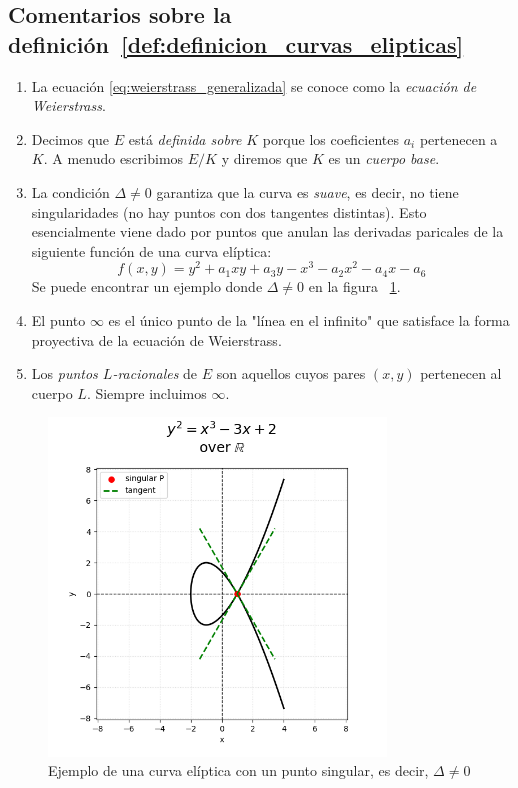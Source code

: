 \subsection{Comentarios sobre la definición~\ref{def:definicion_curvas_elipticas}}
\begin{enumerate}
  \item La ecuación \eqref{eq:weierstrass_generalizada} se conoce como la \emph{ecuación de Weierstrass}.
  \item Decimos que \(E\) está \emph{definida sobre} \(K\) porque los coeficientes \(a_i\) pertenecen a \(K\). A menudo escribimos \(E/K\) y diremos que \(K\) es un \emph{cuerpo base}.
  \item La condición \(\Delta\neq0\) garantiza que la curva es \emph{suave}, es decir, no tiene singularidades (no hay puntos con dos tangentes distintas). Esto esencialmente viene dado por puntos que anulan las derivadas paricales de la siguiente función de una curva elíptica:
  \[
    f(x,y) = y^2 +a_1xy + a_3y -x^3 - a_2x^2 - a_4x - a_6
  \]
  Se puede encontrar un ejemplo donde \(\Delta\neq0\) en la figura ~\ref{fig:elliptic_curve_singular_example}.
  \item El punto \(\infty\) es el único punto de la "línea en el infinito" que satisface la forma proyectiva de la ecuación de Weierstrass.
  \item Los \emph{puntos \(L\)-racionales} de \(E\) son aquellos cuyos pares \((x,y)\) pertenecen al cuerpo \(L\). Siempre incluimos \(\infty\).
\end{enumerate}

\begin{figure}[H]
    \centering
    \includegraphics[width=0.8\textwidth]{imagenes/elliptic_curve_singular_example.png}
    \caption{Ejemplo de una curva elíptica con un punto singular, es decir, \(\Delta\neq0\)}
    \label{fig:elliptic_curve_singular_example}
\end{figure}

